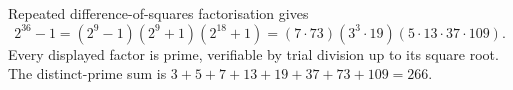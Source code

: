 Repeated difference-of-squares factorisation gives
\[2^{36}-1=(2^9-1)(2^9+1)(2^{18}+1)=(7\cdot73)(3^3\cdot19)(5\cdot13\cdot37\cdot109).\]
Every displayed factor is prime, verifiable by trial division up to its square root. The distinct-prime sum is $ 3+5+7+13+19+37+73+109=\boxed{266}$.
